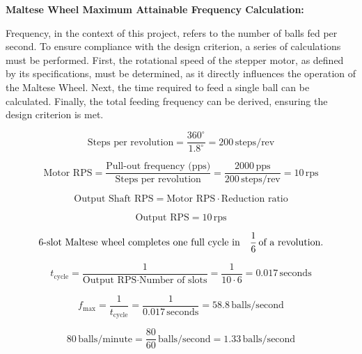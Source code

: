 \documentclass[12pt]{report}
\begin{document}
\textbf{Maltese Wheel Maximum Attainable Frequency Calculation:}

Frequency, in the context of this project, refers to the number of balls fed per second. To ensure compliance with the design criterion, a series of calculations must be performed. First, the rotational speed of the stepper motor, as defined by its specifications, must be determined, as it directly influences the operation of the Maltese Wheel. Next, the time required to feed a single ball can be calculated. Finally, the total feeding frequency can be derived, ensuring the design criterion is met.


\begin{equation}
\text{Steps per revolution} = \frac{360^\circ}{1.8^\circ} = 200 \, \text{steps/rev}
\end{equation}

\begin{equation}
\text{Motor RPS} = \frac{\text{Pull-out frequency (pps)}}{\text{Steps per revolution}} = \frac{2000 \, \text{pps}}{200 \, \text{steps/rev}} = 10 \, \text{rps}
\end{equation}

\begin{equation}
\text{Output Shaft RPS} = \text{Motor RPS} \cdot \text{Reduction ratio}
\end{equation}

\begin{equation}
\text{Output RPS} = 10 \, \text{rps}
\end{equation}

\begin{equation}
\text{6-slot Maltese wheel completes one full cycle in} \quad \frac{1}{6} \, \text{of a revolution.}\notag
\end{equation}

\begin{equation}
t_{\text{cycle}} = \frac{1}{\text{Output RPS} \cdot \text{Number of slots}} = \frac{1}{10 \cdot 6} = 0.017 \, \text{seconds}
\end{equation}

\begin{equation}
f_{\text{max}} = \frac{1}{t_{\text{cycle}}} = \frac{1}{0.017 \, \text{seconds}} = 58.8 \, \text{balls/second}
\end{equation}

\begin{equation}
80 \, \text{balls/minute} = \frac{80}{60} \, \text{balls/second} = 1.33 \, \text{balls/second}
\end{equation}
\end{document}
